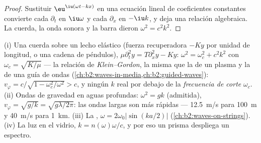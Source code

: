 \begin{proof}
Sustituir $\eu^{\iu(\omega t - kx)}$ en una ecuación lineal de coeficientes
constantes convierte cada $\partial_t$ en $\iu\omega$ y cada $\partial_x$ en
$-\iu k$, y deja una relación algebraica. La cuerda, la onda sonora y la
barra dieron $\omega^2 = c^2k^2$.
\end{proof}

\begin{example}\label{ex:b2:dispersion-wave-packets:examples}
(i) Una cuerda sobre un lecho elástico (fuerza recuperadora $-Ky$ por
unidad de longitud, o una cadena de péndulos), $\mu\partial_t^2y = T\partial_x^2y - Ky$: $\omega^2 = \omega_c^2
+ c^2k^2$ con $\omega_c = \sqrt{K/\mu}$ --- la relación de
\emph{Klein--Gordon}, la misma que la de un plasma y la de una guía de
ondas (\cref{ch:b2:waves-in-media,ch:b2:guided-waves}): $v_\varphi = c/\sqrt{1 -
\omega_c^2/\omega^2} > c$, y ningún $k$ real por debajo de la \emph{frecuencia de corte} $\omega_c$.
(ii) Ondas de gravedad en aguas profundas: $\omega^2 = gk$ (admitida), $v_\varphi =
\sqrt{g/k} = \sqrt{g\lambda/2\pi}$: las ondas largas son más rápidas --- \qty{12.5}{m/s} para
\qty{100}{m} y \qty{40}{m/s} para \qty{1}{km}. (iii) La , $\omega =
2\omega_0|\sin(ka/2)|$ (\cref{ch:b2:waves-on-strings}). (iv) La luz en el vidrio,
$k = n(\omega)\omega/c$, y por eso un prisma despliega un espectro.
\end{example}

